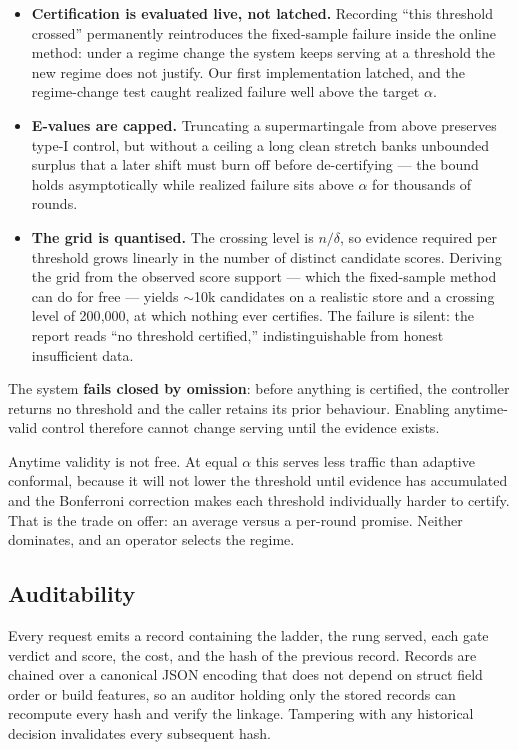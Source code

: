 \documentclass[11pt]{article}
\begin{document}
\begin{itemize}
  \item \textbf{Certification is evaluated live, not latched.} Recording ``this threshold crossed''
  permanently reintroduces the fixed-sample failure inside the online method: under a regime change
  the system keeps serving at a threshold the new regime does not justify. Our first implementation
  latched, and the regime-change test caught realized failure well above the target $\alpha$.
  \item \textbf{E-values are capped.} Truncating a supermartingale from above preserves type-I
  control, but without a ceiling a long clean stretch banks unbounded surplus that a later shift must
  burn off before de-certifying --- the bound holds asymptotically while realized failure sits above
  $\alpha$ for thousands of rounds.
  \item \textbf{The grid is quantised.} The crossing level is $n/\delta$, so evidence required per
  threshold grows linearly in the number of distinct candidate scores. Deriving the grid from the
  observed score support --- which the fixed-sample method can do for free --- yields $\sim$10k
  candidates on a realistic store and a crossing level of 200{,}000, at which nothing ever certifies.
  The failure is silent: the report reads ``no threshold certified,'' indistinguishable from honest
  insufficient data.
\end{itemize}

The system \textbf{fails closed by omission}: before anything is certified, the controller returns no
threshold and the caller retains its prior behaviour. Enabling anytime-valid control therefore cannot
change serving until the evidence exists.

Anytime validity is not free. At equal $\alpha$ this serves less traffic than adaptive conformal,
because it will not lower the threshold until evidence has accumulated and the Bonferroni correction
makes each threshold individually harder to certify. That is the trade on offer: an average versus a
per-round promise. Neither dominates, and an operator selects the regime.

\subsection{Auditability}
\label{sec:audit}

Every request emits a record containing the ladder, the rung served, each gate verdict and score,
the cost, and the hash of the previous record. Records are chained over a canonical JSON encoding
that does not depend on struct field order or build features, so an auditor holding only the stored
records can recompute every hash and verify the linkage. Tampering with any historical decision
invalidates every subsequent hash.
\end{document}
